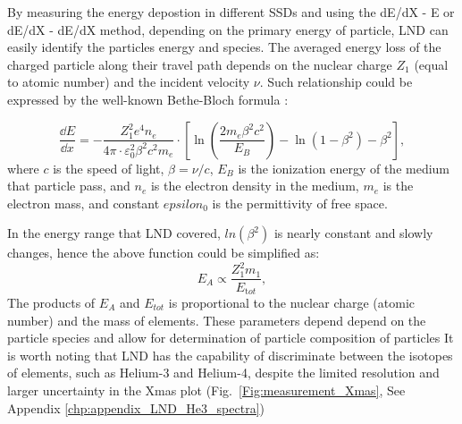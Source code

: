 By measuring the energy depostion in different \acp{SSD} and using the dE/dX - E or dE/dX - dE/dX method, depending on the primary energy of particle, LND can easily identify the particles energy and species. 
The averaged energy loss of the charged particle along their travel path depends on the nuclear charge $Z_1$ (equal to atomic number) and the incident velocity $\nu$. 
Such relationship could be expressed by the well-known Bethe-Bloch formula \citep{bethe-1930, bloch-1933}:

\begin{equation}
    \frac{\dd E}{\dd x} = - \frac{Z_1^2 e^4 n_e}{4 \pi \cdot \varepsilon_0^2 \beta^2 c^2 m_e} \cdot \left[ \ln\left(\frac{2 m_e  \beta^2 c^2}{{E_B}}\right) - \ln(1 - \beta^2) - \beta^2  \right], 
    \label{eq:BB}
  \end{equation}
where $c$ is the speed of light, $\beta = \nu/c$, $E_B$ is the ionization energy of the medium that particle pass, and $n_e$ is the electron density in the medium, $m_e$ is the electron mass, and constant $epsilon_0$ is the permittivity of free space.

In the energy range that \ac{LND} covered, $ln(\beta^2)$ is nearly constant and slowly changes, hence the above function could be simplified as:
\begin{equation}
    E_A \propto \frac{Z_1^2 m_1}{E_{\mathrm tot}},
    \label{eq:BB2}
\end{equation}
The products of $E_A$ and $E_{tot}$ is proportional to the nuclear charge (atomic number) and the mass of elements. These parameters depend depend on the particle species and allow for determination of particle composition of particles It is worth noting that \ac{LND} has the capability of discriminate between the isotopes of elements, such as Helium-3 and Helium-4, despite the limited resolution and larger uncertainty in the Xmas plot (Fig.~\ref{Fig:measurement_Xmas}, See Appendix \ref{chp:appendix_LND_He3_spectra})



